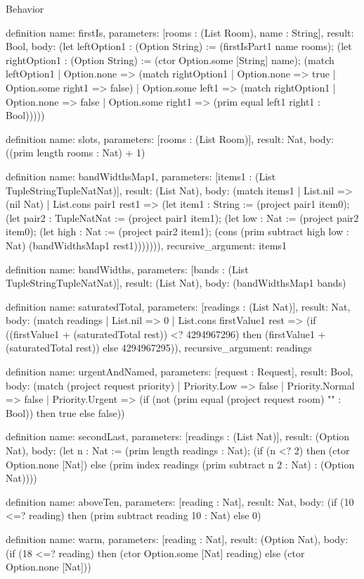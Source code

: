 \begin{lexlean}{Behavior}
\begin{semanticmodule}
definition{
  name: firstIs,
  parameters: [rooms : (List Room), name : String],
  result: Bool,
  body: (let leftOption1 : (Option String) := (firstIsPart1 name rooms); (let rightOption1 : (Option String) := (ctor Option.some [String] name); (match leftOption1
    | Option.none => (match rightOption1 | Option.none => true | Option.some right1 => false)
    | Option.some left1 => (match rightOption1
      | Option.none => false
      | Option.some right1 => (prim equal left1 right1 : Bool)))))
}

definition{
  name: slots,
  parameters: [rooms : (List Room)],
  result: Nat,
  body: ((prim length rooms : Nat) + 1)
}

definition{
  name: bandWidthsMap1,
  parameters: [items1 : (List TupleStringTupleNatNat)],
  result: (List Nat),
  body: (match items1
    | List.nil => (nil Nat)
    | List.cons pair1 rest1 => (let item1 : String := (project pair1 item0); (let pair2 : TupleNatNat := (project pair1 item1); (let low : Nat := (project pair2 item0); (let high : Nat := (project pair2 item1); (cons (prim subtract high low : Nat) (bandWidthsMap1 rest1))))))),
  recursive_argument: items1
}

definition{
  name: bandWidths,
  parameters: [bands : (List TupleStringTupleNatNat)],
  result: (List Nat),
  body: (bandWidthsMap1 bands)
}

definition{
  name: saturatedTotal,
  parameters: [readings : (List Nat)],
  result: Nat,
  body: (match readings
    | List.nil => 0
    | List.cons firstValue1 rest => (if ((firstValue1 + (saturatedTotal rest)) <? 4294967296) then (firstValue1 + (saturatedTotal rest)) else 4294967295)),
  recursive_argument: readings
}

definition{
  name: urgentAndNamed,
  parameters: [request : Request],
  result: Bool,
  body: (match (project request priority)
    | Priority.Low => false
    | Priority.Normal => false
    | Priority.Urgent => (if (not (prim equal (project request room) "" : Bool)) then true else false))
}

definition{
  name: secondLast,
  parameters: [readings : (List Nat)],
  result: (Option Nat),
  body: (let n : Nat := (prim length readings : Nat); (if (n <? 2) then (ctor Option.none [Nat]) else (prim index readings (prim subtract n 2 : Nat) : (Option Nat))))
}

definition{
  name: aboveTen,
  parameters: [reading : Nat],
  result: Nat,
  body: (if (10 <=? reading) then (prim subtract reading 10 : Nat) else 0)
}

definition{
  name: warm,
  parameters: [reading : Nat],
  result: (Option Nat),
  body: (if (18 <=? reading) then (ctor Option.some [Nat] reading) else (ctor Option.none [Nat]))
}


\end{semanticmodule}
\end{lexlean}
